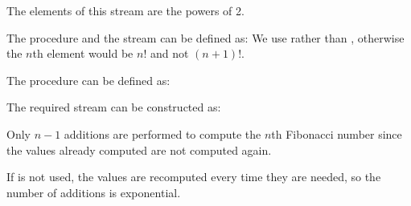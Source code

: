 \begin{exe}[3.53]
    The elements of this stream are the powers of 2.
\end{exe}

\begin{exe}[3.54]
    The procedure  and the stream  can be 
    defined as:
    We use  rather than , otherwise 
    the $n$th element would be $n!$ and not $(n + 1)!$.
\end{exe}

\begin{exe}[3.55]
    The procedure  can be defined as:
\end{exe}

\begin{exe}[3.56]
    The required stream can be constructed as:
\end{exe}

\begin{exe}[3.57]
    Only $n - 1$ additions are performed to compute the $n$th Fibonacci number 
    since the values already computed are not computed again.

    If  is not used, the values are recomputed every time they 
    are needed, so the number of additions is exponential.
\end{exe}
